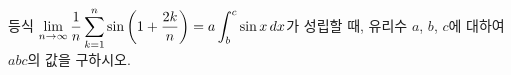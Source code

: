 \hspace*{2mm}\begin{minipage}[t]{\dimexpr\linewidth-2mm\relax}\vspace{0pt}
등식 $\displaystyle\lim_{n\to\infty}\dfrac{1}{n}\sum_{k=1}^{n}\sin\left(1+\dfrac{2k}{n}\right)=a\int_{b}^{c}\sin x\mkern3mu dx$가 성립할 때, 유리수 $a$, $b$, $c$에 대하여 $abc$의 값을 구하시오. \end{minipage}

